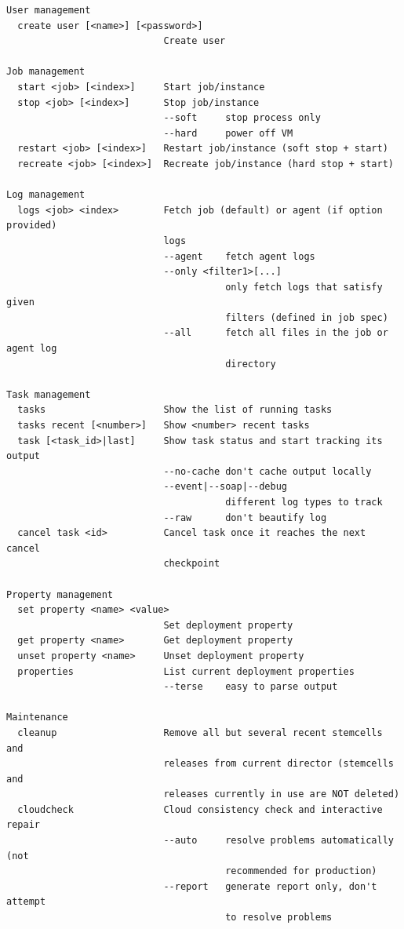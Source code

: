 \begin{adjustwidth}{2.5em}{2.5em}
\begin{verbatim}
User management
  create user [<name>] [<password>] 
                            Create user 

Job management
  start <job> [<index>]     Start job/instance 
  stop <job> [<index>]      Stop job/instance 
                            --soft     stop process only 
                            --hard     power off VM 
  restart <job> [<index>]   Restart job/instance (soft stop + start) 
  recreate <job> [<index>]  Recreate job/instance (hard stop + start) 

Log management
  logs <job> <index>        Fetch job (default) or agent (if option provided) 
                            logs 
                            --agent    fetch agent logs 
                            --only <filter1>[...] 
                                       only fetch logs that satisfy given 
                                       filters (defined in job spec) 
                            --all      fetch all files in the job or agent log 
                                       directory 

Task management
  tasks                     Show the list of running tasks 
  tasks recent [<number>]   Show <number> recent tasks 
  task [<task_id>|last]     Show task status and start tracking its output 
                            --no-cache don't cache output locally 
                            --event|--soap|--debug 
                                       different log types to track 
                            --raw      don't beautify log 
  cancel task <id>          Cancel task once it reaches the next cancel 
                            checkpoint 

Property management
  set property <name> <value> 
                            Set deployment property 
  get property <name>       Get deployment property 
  unset property <name>     Unset deployment property 
  properties                List current deployment properties 
                            --terse    easy to parse output 

Maintenance
  cleanup                   Remove all but several recent stemcells and 
                            releases from current director (stemcells and 
                            releases currently in use are NOT deleted) 
  cloudcheck                Cloud consistency check and interactive repair 
                            --auto     resolve problems automatically (not 
                                       recommended for production) 
                            --report   generate report only, don't attempt 
                                       to resolve problems 


\end{verbatim}
\end{adjustwidth}
